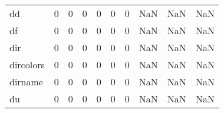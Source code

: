 \begin{longtable}{lrrrrrrrrr}
dd        &                                       0 &                                                  0 &                                                  0 &                                                  0 &                                                  0 &                                                  0 &                                                NaN &                                    NaN &                                  NaN \\
df        &                                       0 &                                                  0 &                                                  0 &                                                  0 &                                                  0 &                                                  0 &                                                NaN &                                    NaN &                                  NaN \\
dir       &                                       0 &                                                  0 &                                                  0 &                                                  0 &                                                  0 &                                                  0 &                                                NaN &                                    NaN &                                  NaN \\
dircolors &                                       0 &                                                  0 &                                                  0 &                                                  0 &                                                  0 &                                                  0 &                                                NaN &                                    NaN &                                  NaN \\
dirname   &                                       0 &                                                  0 &                                                  0 &                                                  0 &                                                  0 &                                                  0 &                                                NaN &                                    NaN &                                  NaN \\
du        &                                       0 &                                                  0 &                                                  0 &                                                  0 &                                                  0 &                                                  0 &                                                NaN &                                    NaN &                                  NaN \\

\end{longtable}
